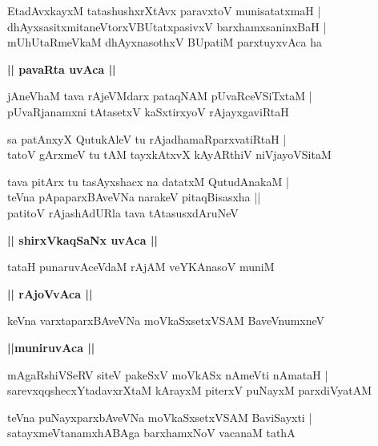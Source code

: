 \documentclass[twoside,12pt,openright]{book}
\newcounter{shloka}[chapter]
\def\uvaca#1{\centerline{{\large\textbf{#1}}}}
\begin{document}
\begin{shloka}%
EtadAvxkayxM tatashushxrXtAvx paravxtoV munisatatxmaH |\\
dhAyxsasitxmitaneVtorxVBUtatxpasivxV barxhamxsaninxBaH |\\
mUhUtaRmeVkaM dhAyxnasothxV BUpatiM parxtuyxvAca ha 
\end{shloka}

\uvaca{|| pavaRta uvAca ||}

\begin{shloka}%
jAneVhaM tava rAjeVMdarx pataqNAM pUvaRceVSiTxtaM |\\
pUvaRjanamxni tAtasetxV kaSxtirxyoV rAjayxgaviRtaH 
\end{shloka}

\begin{shloka}%
sa patAnxyX QutukAleV tu rAjadhamaRparxvatiRtaH |\\
tatoV gArxmeV tu tAM tayxkAtxvX kAyARthiV niVjayoVSitaM 
\end{shloka}

\begin{shloka}%
tava pitArx tu tasAyxshacx na datatxM QutudAnakaM |\\
teVna pApaparxBAveVNa narakeV pitaqBisasxha ||\\
patitoV rAjashAdURla tava tAtasusxdAruNeV 
\end{shloka}

\uvaca{|| shirxVkaqSaNx uvAca ||}

\begin{shloka}%
tataH punaruvAceVdaM rAjAM veYKAnasoV muniM 
\end{shloka}

\uvaca{|| rAjoVvAca ||}

\begin{shloka}%
keVna varxtaparxBAveVNa moVkaSxsetxVSAM BaveVnumxneV 
\end{shloka}

\uvaca{||muniruvAca ||}

\begin{shloka}%
mAgaRshiVSeRV siteV pakeSxV moVkASx nAmeVti nAmataH |\\
sarevxqqshecxYtadavxrXtaM kArayxM piterxV puNayxM parxdiVyatAM
\end{shloka}

\begin{shloka}%
teVna puNayxparxbAveVNa moVkaSxsetxVSAM BaviSayxti |\\
satayxmeVtanamxhABAga barxhamxNoV vacanaM tathA 
\end{shloka}
\end{document}
